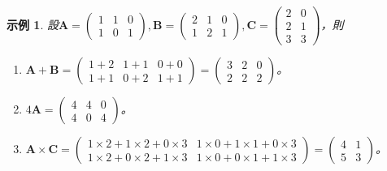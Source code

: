 \documentclass[12pt]{article}
\newtheorem*{example}{示例}
\begin{document}
    \begin{example}
        設$\mathbf{A}=\begin{pmatrix}
            1&1&0\\1&0&1
        \end{pmatrix},\mathbf{B}=\begin{pmatrix}
            2&1&0\\1&2&1
        \end{pmatrix},\mathbf{C}=\begin{pmatrix}
            2&0\\2&1\\3&3
        \end{pmatrix}$，則\begin{enumerate}
            \item $\mathbf{A}+\mathbf{B}=\begin{pmatrix}
                1+2&1+1&0+0\\1+1&0+2&1+1
            \end{pmatrix}=\begin{pmatrix}
                3&2&0\\2&2&2
            \end{pmatrix}$。
            \item $4\mathbf{A}=\begin{pmatrix}
                4&4&0\\4&0&4
            \end{pmatrix}$。
            \item $\mathbf{A}\times\mathbf{C}=\begin{pmatrix}
                1\times2+1\times2+0\times3&1\times0+1\times1+0\times3\\1\times2+0\times2+1\times3&1\times0+0\times1+1\times3
            \end{pmatrix}=\begin{pmatrix}
                4&1\\5&3
            \end{pmatrix}$。
        \end{enumerate}
    \end{example}
\end{document}
